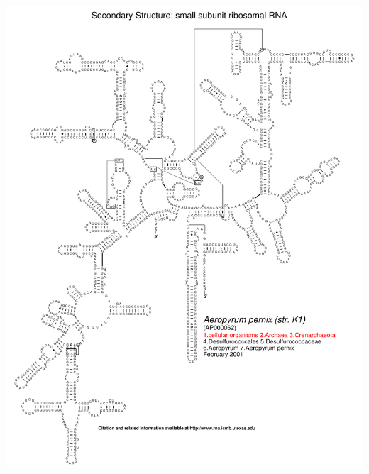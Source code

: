 \documentclass[landscape]{slides}
\begin{document}
\begin{slide}\begin{center}\includegraphics[height=8in]{figs/arc-2}\end{center}\vfill\end{slide}
\end{document}
